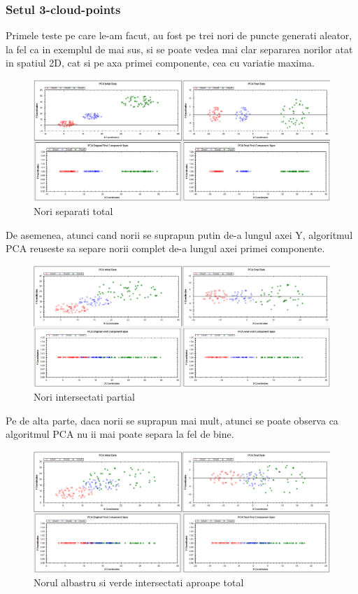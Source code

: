 \documentclass[12pt,oneside]{article}
\begin{document}
\subsubsection{Setul 3-cloud-points}
Primele teste pe care le-am facut, au fost pe trei nori de puncte generati aleator, la fel ca in exemplul de mai sus, si se poate vedea mai clar separarea norilor atat in spatiul 2D, cat si pe axa primei componente, cea cu variatie maxima. \begin{figure}[H]
	\caption{Nori separati total}
	\centering
	\includegraphics[width=\linewidth]{threecloud1}
\end{figure}

De asemenea, atunci cand norii se suprapun putin de-a lungul axei Y, algoritmul PCA reuseste sa separe norii complet de-a lungul axei primei componente. 

\begin{figure}[H]
\caption{Nori intersectati partial}
\centering
\includegraphics[width=\linewidth]{threecloud2}
\end{figure}

Pe de alta parte, daca norii se suprapun mai mult, atunci se poate observa ca algoritmul PCA nu ii mai poate separa la fel de bine.

\begin{figure}[H]
\centering
\caption{Norul albastru si verde intersectati aproape total}
\includegraphics[width=\linewidth]{threecloud3}
\end{figure}
\end{document}
